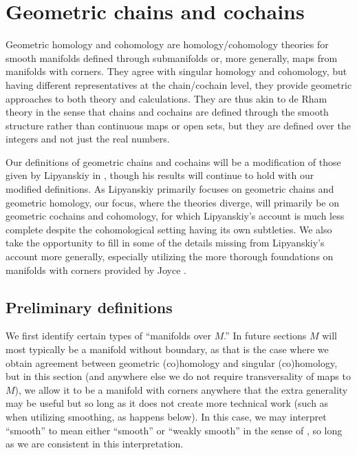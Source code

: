 
\section{Geometric chains and cochains}\label{S: geometric cochains}

Geometric homology and cohomology are homology/cohomology theories for smooth manifolds defined through submanifolds or, more generally, maps from manifolds with corners.
They agree with singular homology and cohomology, but having different representatives
at the chain/cochain level, they provide geometric approaches to both theory and calculations.
They are thus akin to de Rham theory in the sense that chains and cochains are defined through the smooth structure rather than continuous maps or open sets, but they are defined over the integers and not just the real numbers.

Our definitions of geometric chains and cochains will be a modification of those given by Lipyanskiy in \cite{Lipy14}, though his results will continue to hold with our modified definitions.
As Lipyanskiy primarily focuses on geometric chains and geometric homology, our focus, where the theories diverge, will primarily be on geometric cochains and cohomology, for which Lipyanskiy's account is much less complete despite the cohomological setting having its own subtleties.
We also take the opportunity to fill in some of the details missing from Lipyanskiy's account more generally, especially utilizing the more thorough foundations on manifolds with corners provided by Joyce \cite{Joy12}.

\subsection{Preliminary definitions}

We first identify certain types of ``manifolds over $M$.'' In future sections $M$ will most typically be a manifold without boundary, as that is the case where we obtain agreement between geometric (co)homology and singular (co)homology, but in this section (and anywhere else we do not require transversality of maps to $M$), we allow it to be a manifold with corners anywhere that the extra generality may be useful but so long as it does not create more technical work (such as when utilizing smoothing, as happens below).
In this case, we may interpret ``smooth'' to mean either ``smooth'' or ``weakly smooth'' in the sense of \cite{Joy12}, so long as we are consistent in this interpretation.

